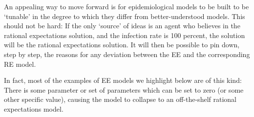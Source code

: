 An appealing way to move forward is for epidemiological models to be built to be `tunable' in the degree to which they differ from better-understood models.  This should not be hard:  If the only `source' of ideas is an agent who believes in the rational expectations solution, and the infection rate is 100 percent, the solution will be the rational expectations solution.  It will then be possible to pin down, step by step, the reasons for any deviation between the EE and the corresponding RE model.

In fact, most of the examples of EE models we highlight below are of this kind: There is some parameter or set of parameters which can be set to zero (or some other specific value), causing the model to collapse to an off-the-shelf rational expectations model.%

